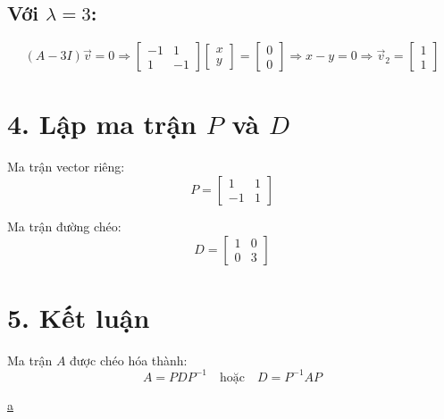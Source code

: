 \documentclass[12pt]{article}
\begin{document}
\subsection*{Với \( \lambda = 3 \):}
\[
(A - 3I)\vec{v} = 0 \Rightarrow
\begin{bmatrix}
-1 & 1 \\
1 & -1
\end{bmatrix}
\begin{bmatrix}
x \\
y
\end{bmatrix}
= \begin{bmatrix}
0 \\
0
\end{bmatrix}
\Rightarrow x - y = 0 \Rightarrow \vec{v}_2 = \begin{bmatrix} 1 \\ 1 \end{bmatrix}
\]

\section*{4. Lập ma trận \( P \) và \( D \)}

Ma trận vector riêng:
\[
P = \begin{bmatrix}
1 & 1 \\
-1 & 1
\end{bmatrix}
\]

Ma trận đường chéo:
\[
D = \begin{bmatrix}
1 & 0 \\
0 & 3
\end{bmatrix}
\]

\section*{5. Kết luận}

Ma trận \( A \) được chéo hóa thành:
\[
A = P D P^{-1}
\quad \text{hoặc} \quad
D = P^{-1} A P
\]

\href{https://tratoa.github.io/MAE101/Eigenvalues.html}{a}
\end{document}
